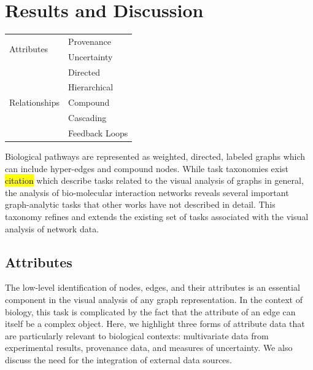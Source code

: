\section*{Results and Discussion}


\begin{table}
  \begin{tabular}{| l | l |}
    \hline
    \multirow{2}{*}{Attributes} & Provenance \\
    & Uncertainty \\ \hline
    \multirow{5}{*}{Relationships} & Directed \\
    & Hierarchical \\
    & Compound \\
    & Cascading \\
    & Feedback Loops \\ \hline
  \end{tabular}
\end{table}


Biological pathways are represented as weighted, directed, labeled graphs which can include hyper-edges and compound nodes.
While task taxonomies exist \hl{citation} which describe tasks related to the visual analysis of graphs in general, the analysis of bio-molecular interaction networks reveals several important graph-analytic tasks that other works have not described in detail. This taxonomy refines and extends the existing set of tasks associated with the visual analysis of network data.

\subsection*{Attributes}

The low-level identification of nodes, edges, and their attributes is an essential component in the visual analysis of any graph representation.
In the context of biology, this task is complicated by the fact that the attribute of an edge can itself be a complex object.
Here, we highlight three forms of attribute data that are particularly relevant to biological contexts: multivariate data from experimental results, provenance data, and measures of uncertainty.
We also discuss the need for the integration of external data sources.

